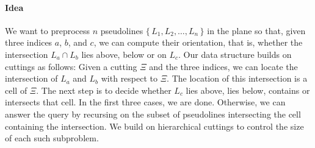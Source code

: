 \paragraph*{Idea} We want to preprocess \(n\) pseudolines \( \{\, L_1,
L_2, \ldots, L_n\,\} \) in the plane so that, given three indices \(a\),
\(b\), and \(c\), we can compute their orientation, that is, whether the
intersection \(L_a \cap L_b\) lies above, below or on \(L_c\). Our
data structure builds on cuttings as follows: Given a cutting \(\Xi\) and the
three indices, we can locate the intersection of \(L_a\) and \(L_b\)
with respect to \(\Xi\). The location of this intersection is a cell of
\(\Xi\). The next step is to decide whether \(L_c\) lies above, lies below,
contains or intersects that cell. In the first three cases, we are done.
Otherwise, we can answer the query by recursing on the subset of pseudolines
intersecting the cell containing the intersection. We build on hierarchical
cuttings to control the size of each such subproblem.
